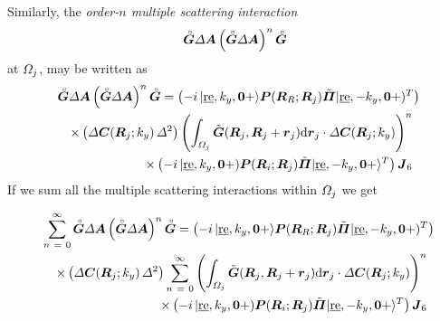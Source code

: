 Similarly, the {\em  order-$n$ multiple scattering interaction\/} 
\[
{\stackrel{\scriptscriptstyle _{\,\,\circ}}{ \mbox{\boldmath$\mit G$\unboldmath}}}{\mit \Delta} {\mbox{\boldmath$\mit A$\unboldmath}} \left({\stackrel{\scriptscriptstyle _{\,\,\circ}}{ \mbox{\boldmath$\mit G$\unboldmath}}}
{\mit \Delta} {\mbox{\boldmath$\mit A$\unboldmath}}\right)^n {\stackrel{\scriptscriptstyle _{\,\,\circ}}{ \mbox{\boldmath$\mit G$\unboldmath}}}
\]
at 
${\mit \Omega}_j$, may be written as
\begin{eqnarray} \label{Dscatnmat}
\lefteqn{{\rf{\bmi G}}{\mit \Delta} {\bmi A} \left({\rf{\bmi G}}
{\mit \Delta} {\bmi A}\right)^n {\rf{\bmi G}}=
\left(-i\,|\re,k_y,{\bf 0}+\rangle {\bmi  P}({\bmi  R}_{R};{\bmi  R}_{j})
	\tilde{\bmi \Pi}|\re,-k_y,{\bf 0}+)^{T}\right)}\nonumber\\
&&	\times\left({\mit \Delta}{\bmi 
	C}({\bmi R}_j;k_y)\,{\mit \Delta}^2  \right)
\left(\int_{{\mit \Omega }_{j}}{\tilde{\bmi  
G}}({\bmi 
R}_j,{\bmi  R}_j+{\bmi  r}_j){\rm d}{\bmi r}_j \cdot{\mit \Delta}{\bmi 
	C}({\bmi R}_j;k_y)\right)^n\nonumber\\
&&\times
\left( -i\,|\re,k_y,{\bf 0}+) {\bmi  P}({\bmi  R}_{i};{\bmi  R}_{j})
	\tilde{\bmi \Pi}|\re,-k_y,{\bf 0}+\rangle^{T}\right){\bmi J}_{6}
\end{eqnarray}
If we sum all the multiple scattering interactions within ${ \mit \Omega }_{j}$  we get
\begin{samepage}
\begin{eqnarray} \label{msomegaj}
\lefteqn{
 \sum\limits_{ n\ =\ 0}^{ \infty } {\rf{\bmi G}}{\mit \Delta} {\bmi A} \left({\rf{\bmi G}}
{\mit \Delta} {\bmi A}\right)^n {\rf{\bmi G}}=
\left(-i\,|\re,k_y,{\bf 0}+\rangle {\bmi  P}({\bmi  R}_{R};{\bmi  R}_{j})
	\tilde{\bmi \Pi}|\re,-k_y,{\bf 0}+)^{T}\right)}
\nonumber\\
&&
\times \left({\mit \Delta}{\bmi 
	C}({\bmi R}_j;k_y)\,{\mit \Delta}^2  \right)
\sum\limits_{ n\ =\ 0}^{ \infty }\left(\int_{{\mit \Omega }_{j}}{\tilde{\bmi  
G}}({\bmi 
R}_j,{\bmi  R}_j+{\bmi  r}_j){\rm d}{\bmi r}_j \cdot{\mit \Delta}{\bmi 
	C}({\bmi R}_j;k_y)\right)^n\nonumber\\
&&\times
\left( -i\,|\re,k_y,{\bf 0}+) {\bmi  P}({\bmi  R}_{i};{\bmi  R}_{j})
	\tilde{\bmi \Pi}|\re,-k_y,{\bf 0}+\rangle^{T}\right){\bmi J}_{6}
\end{eqnarray}
\end{samepage}



